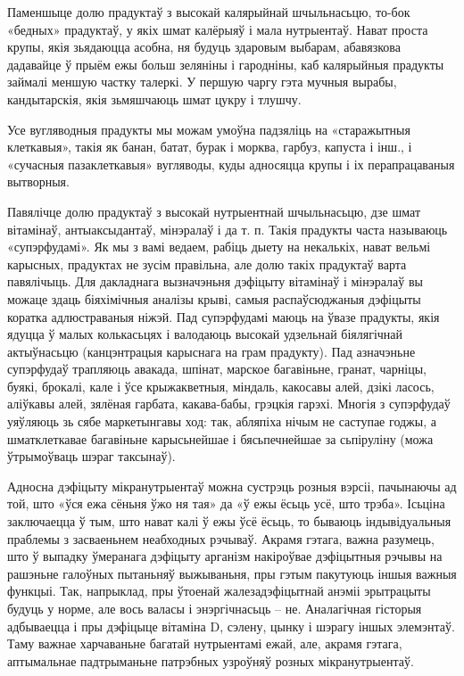 Паменшыце долю прадуктаў з высокай калярыйнай шчыльнасьцю, то-бок «бедных» прадуктаў, у якіх шмат калёрыяў і мала нутрыентаў. Нават проста крупы, якія зьядаюцца асобна, ня будуць здаровым выбарам, абавязкова дадавайце ў прыём ежы больш зеляніны і гародніны, каб калярыйныя прадукты займалі меншую частку талеркі. У першую чаргу гэта мучныя вырабы, кандытарскія, якія зьмяшчаюць шмат цукру і тлушчу.

Усе вугляводныя прадукты мы можам умоўна падзяліць на «старажытныя клеткавыя», такія як банан, батат, бурак і морква, гарбуз, капуста і інш., і «сучасныя пазаклеткавыя» вугляводы, куды адносяцца крупы і іх перапрацаваныя вытворныя.

Павялічце долю прадуктаў з высокай нутрыентнай шчыльнасьцю, дзе шмат вітамінаў, антыаксыдантаў, мінэралаў і да т. п. Такія прадукты часта называюць «супэрфудамі». Як мы з вамі ведаем, рабіць дыету на некалькіх, нават вельмі карысных, прадуктах не зусім правільна, але долю такіх прадуктаў варта павялічыць. Для дакладнага вызначэньня дэфіцыту вітамінаў і мінэралаў вы можаце здаць біяхімічныя аналізы крыві, самыя распаўсюджаныя дэфіцыты коратка адлюстраваныя ніжэй. Пад супэрфудамі маюць на ўвазе прадукты, якія ядуцца ў малых колькасьцях і валодаюць высокай удзельнай біялягічнай актыўнасьцю (канцэнтрацыя карыснага на грам прадукту). Пад азначэньне супэрфудаў трапляюць авакада, шпінат, марское багавіньне, гранат, чарніцы, буякі, брокалі, кале і ўсе крыжакветныя, міндаль, какосавы алей, дзікі ласось, аліўкавы алей, зялёная гарбата, какава-бабы, грэцкія гарэхі. Многія з супэрфудаў уяўляюць зь сябе маркетынгавы ход: так, абляпіха нічым не саступае годжы, а шматклеткавае багавіньне карысьнейшае і бясьпечнейшае за сьпіруліну (можа ўтрымоўваць шэраг таксынаў).

Адносна дэфіцыту мікранутрыентаў можна сустрэць розныя вэрсіі, пачынаючы ад той, што «ўся ежа сёньня ўжо ня тая» да «ў ежы ёсьць усё, што трэба». Ісьціна заключаецца ў тым, што нават калі ў ежы ўсё ёсьць, то бываюць індывідуальныя праблемы з засваеньнем неабходных рэчываў. Акрамя гэтага, важна разумець, што ў выпадку ўмеранага дэфіцыту арганізм накіроўвае дэфіцытныя рэчывы на рашэньне галоўных пытаньняў выжываньня, пры гэтым пакутуюць іншыя важныя функцыі. Так, напрыклад, пры ўтоенай жалезадэфіцытнай анэміі эрытрацыты будуць у норме, але вось валасы і энэргічнасьць – не. Аналагічная гісторыя адбываецца і пры дэфіцыце вітаміна D, сэлену, цынку і шэрагу іншых элемэнтаў. Таму важнае харчаваньне багатай нутрыентамі ежай, але, акрамя гэтага, аптымальнае падтрыманьне патрэбных узроўняў розных мікранутрыентаў.

